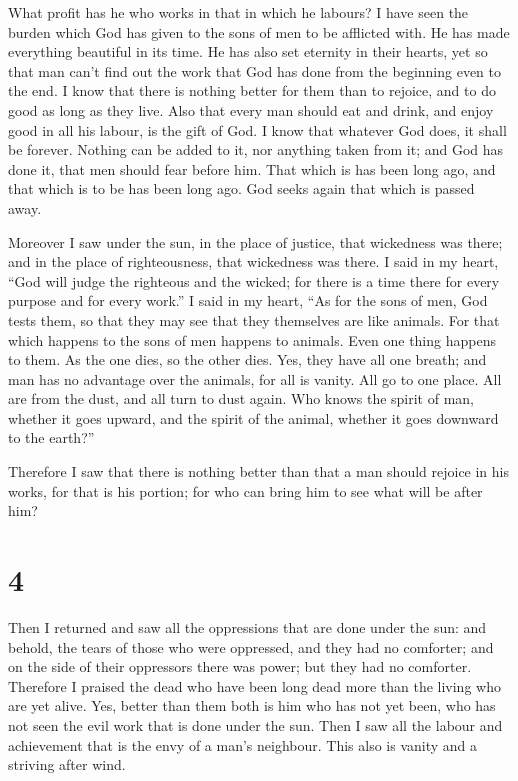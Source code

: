  What profit has he who works in that in which he labours?
 I have seen the burden which God has given to the sons
of men to be afflicted with.  He has made everything
beautiful in its time. He has also set eternity in their hearts, yet so
that man can't find out the work that God has done from the beginning
even to the end.  I know that there is nothing better for
them than to rejoice, and to do good as long as they live.
 Also that every man should eat and drink, and enjoy good
in all his labour, is the gift of God.  I know that
whatever God does, it shall be forever. Nothing can be added to it, nor
anything taken from it; and God has done it, that men should fear before
him.  That which is has been long ago, and that which is
to be has been long ago. God seeks again that which is passed away.

 Moreover I saw under the sun, in the place of justice,
that wickedness was there; and in the place of righteousness, that
wickedness was there.  I said in my heart, ``God will
judge the righteous and the wicked; for there is a time there for every
purpose and for every work.''  I said in my heart, ``As
for the sons of men, God tests them, so that they may see that they
themselves are like animals.  For that which happens to
the sons of men happens to animals. Even one thing happens to them. As
the one dies, so the other dies. Yes, they have all one breath; and man
has no advantage over the animals, for all is vanity. 
All go to one place. All are from the dust, and all turn to dust again.
 Who knows the spirit of man, whether it goes upward, and
the spirit of the animal, whether it goes downward to the earth?''

 Therefore I saw that there is nothing better than that a
man should rejoice in his works, for that is his portion; for who can
bring him to see what will be after him?

\hypertarget{section-3}{%
\section{4}\label{section-3}}

 Then I returned and saw all the oppressions that are done
under the sun: and behold, the tears of those who were oppressed, and
they had no comforter; and on the side of their oppressors there was
power; but they had no comforter.  Therefore I praised the
dead who have been long dead more than the living who are yet alive.
 Yes, better than them both is him who has not yet been,
who has not seen the evil work that is done under the sun.
 Then I saw all the labour and achievement that is the
envy of a man's neighbour. This also is vanity and a striving after
wind.

